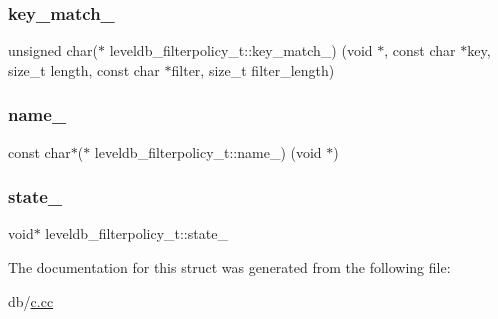 \mbox{\label{structleveldb__filterpolicy__t_a453f04cb3420879256c6194b5de0a818}} 
\subsubsection{\texorpdfstring{key\_match\_}{key\_match\_}}
{\footnotesize\ttfamily unsigned char($\ast$ leveldb\+\_\+filterpolicy\+\_\+t\+::key\+\_\+match\+\_\+) (void $\ast$, const char $\ast$key, size\+\_\+t length, const char $\ast$filter, size\+\_\+t filter\+\_\+length)}

\mbox{\label{structleveldb__filterpolicy__t_a5fbc18ad0916314ffafe205543bad720}} 
\subsubsection{\texorpdfstring{name\_}{name\_}}
{\footnotesize\ttfamily const char$\ast$($\ast$ leveldb\+\_\+filterpolicy\+\_\+t\+::name\+\_\+) (void $\ast$)}

\mbox{\label{structleveldb__filterpolicy__t_a35aa5dd2f350f6eafa4ae904e55dcbe2}} 
\subsubsection{\texorpdfstring{state\_}{state\_}}
{\footnotesize\ttfamily void$\ast$ leveldb\+\_\+filterpolicy\+\_\+t\+::state\+\_\+}



The documentation for this struct was generated from the following file\+:\begin{DoxyCompactItemize}
\item 
db/\mbox{\hyperlink{c_8cc}{c.\+cc}}\end{DoxyCompactItemize}
